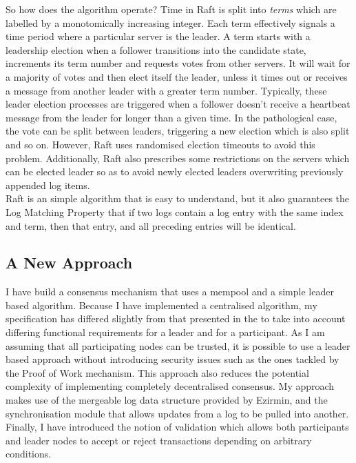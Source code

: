\documentclass[12pt,a4paper,twoside,openright]{report}
\begin{document}
			So how does the algorithm operate? 
			Time in Raft is split into \textit{terms} which are labelled by a monotomically increasing integer. 
			Each term effectively signals a time period where a particular server is the leader. 
			A term starts with a leadership election when a follower transitions into the candidate state, increments its term number and requests votes from other servers. 
			It will wait for a majority of votes and then elect itself the leader, unless it times out or receives a message from another leader with a greater term number. 
			Typically, these leader election processes are triggered when a follower doesn't receive a heartbeat message from the leader for longer than a given time.
			In the pathological case, the vote can be split between leaders, triggering a new election which is also split and so on.
			However, Raft uses randomised election timeouts to avoid this problem.
			Additionally, Raft also prescribes some restrictions on the servers which can be elected leader so as to avoid newly elected leaders overwriting previously appended log items.\\
			
			Raft is an simple algorithm that is easy to understand, but it also guarantees the Log Matching Property that if two logs contain a log entry with the same index and term, then that entry, and all preceding entries will be identical.

		\subsection{A New Approach}
		I have build a consensus mechanism that uses a mempool and a simple leader based algorithm. 
		Because I have implemented a centralised algorithm, my specification has differed slightly from that presented in the  to take into account differing functional requirements for a leader and for a participant.
		As I am assuming that all participating nodes can be trusted, it is possible to use a leader based approach without introducing security issues such as the ones tackled by the Proof of Work mechanism. 
		This approach also reduces the potential complexity of implementing completely decentralised consensus.
		My approach makes use of the mergeable log data structure provided by Ezirmin, and the synchronisation module that allows updates from a log to be pulled into another.
		Finally, I have introduced the notion of validation which allows both participants and leader nodes to accept or reject transactions depending on arbitrary conditions.
		
\end{document}
